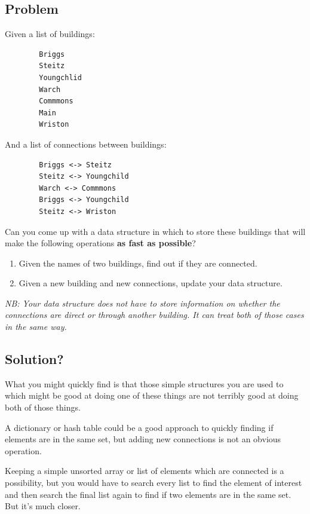 \documentclass[]{article}
\begin{document}
\subsection*{Problem}

    Given a list of buildings:

    \begin{verbatim}
        Briggs
        Steitz
        Youngchlid
        Warch
        Commmons
        Main
        Wriston
    \end{verbatim}

    And a list of connections between buildings:

    \begin{verbatim}
        Briggs <-> Steitz
        Steitz <-> Youngchild
        Warch <-> Commmons
        Briggs <-> Youngchild
        Steitz <-> Wriston
    \end{verbatim}

    Can you come up with a data structure in which to store these buildings that will make the following operations \textbf{as fast as possible}? 

    \begin{enumerate}
        \item Given the names of two buildings, find out if they are connected.
        \item Given a new building and new connections, update your data structure.
    \end{enumerate}

    \textit{NB: Your data structure does not have to store information on whether the connections are direct or through another building. It can treat both of those cases in the same way.}

    \subsection*{Solution?}

    What you might quickly find is that those simple structures you are used to which might be good at doing one of these things are not terribly good at doing both of those things. 
    
    A dictionary or hash table could be a good approach to quickly finding if elements are in the same set, but adding new connections is not an obvious operation.

    Keeping a simple unsorted array or list of elements which are connected is a possibility, but you would have to search every list to find the element of interest and then search the final list again to find if two elements are in the same set. But it's much closer. 
\end{document}
